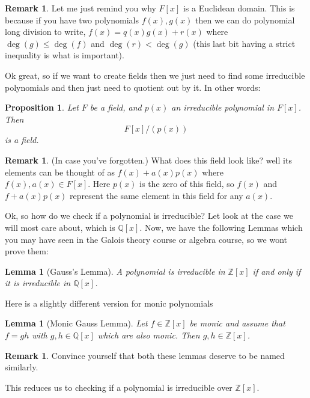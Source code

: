 \documentclass[11pt,a4paper]{report}
\theoremstyle{plain}
\newtheorem{lemma}[subsection]{Lemma}
\newtheorem{prop}[subsection]{Proposition}
\theoremstyle{definition}
\theoremstyle{definition}
\newtheorem{rmrk}[subsection]{Remark}
\newcommand{\ZZ}{\mathbb{Z}}
\def\QQ{\mathbb{Q}}
\begin{document}
	\begin{rmrk}
		Let me just remind you why $F[x]$ is a Euclidean domain. This is because if you have two polynomials $f(x),g(x)$ then we can do polynomial long division to write, $f(x)=q(x)g(x)+r(x)$ where $\deg(g) \leq \deg(f)$ and  $\deg(r) < \deg(g)$ (this last bit having a strict inequality is what is important).
	\end{rmrk}
	
	Ok great, so if we want to create fields then we just need to find some irreducible polynomials and then just need to quotient out by it. In other words:
	
	\begin{prop}\label{propo: quot by irr pol gives field}
		Let $F$ be a field, and $p(x)$ an irreducible polynomial in $F[x]$. Then \[F[x]/(p(x))\] is a field.
	\end{prop}
	
	\begin{rmrk}
		(In case you've forgotten.) What does this field look like? well its elements can be thought of as $f(x)+a(x) p(x)$ where $f(x), a(x) \in F[x]$. Here $p(x)$ is the zero of this field, so $f(x)$ and $f+a(x)p(x)$ represent the same element in this field for any $a(x)$.
	\end{rmrk}
	
	
	Ok, so how do we check if a polynomial is irreducible? Let look at the case we will most care about, which is $\QQ[x]$. Now, we have the following Lemmas which you may have seen in the Galois theory course or algebra course, so we wont prove them:
	\begin{lemma}[Gauss's Lemma]
		A polynomial is irreducible in $\ZZ[x]$ if and only if it is irreducible in $\QQ[x]$.
	\end{lemma}	
	
	Here is a slightly different version for monic polynomials
	
	\begin{lemma}[Monic Gauss Lemma]\label{monic gauss}
		Let $f \in \ZZ[x]$ be monic and assume that $f=gh$ with $g,h \in \QQ[x]$ which are also monic. Then $g,h \in \ZZ[x]$. 
	\end{lemma}
	
	
	
	
	
	\begin{rmrk}
		Convince yourself that both these lemmas deserve to be named similarly.	
	\end{rmrk}	
	This reduces us to checking if a polynomial is irreducible over $\ZZ[x]$.
	
\end{document}
